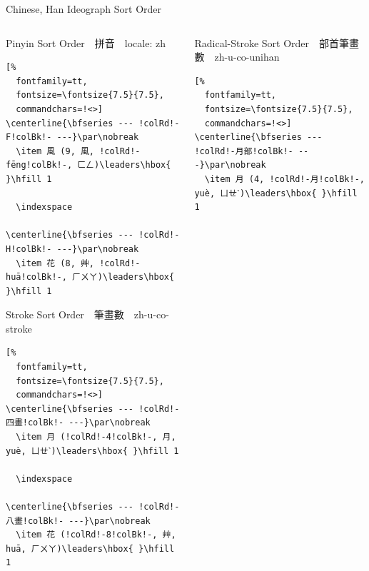 \documentclass[aspectratio=169,10pt]{beamer}
\begin{document}
\begin{frame}[fragile]{Chinese, Han Ideograph Sort Order}
\begin{columns}
\begin{column}{73mm}
\begin{exampleblock}{Pinyin {\footnotesize Sort Order~~拼音~~\scriptsize locale: zh}}
\makeatletter
\def\verbatim@font{\fontsize{7.5}{7.5}\selectfont\textjapanese}
\makeatother
\begin{Verbatim}[%
  fontfamily=tt,
  fontsize=\fontsize{7.5}{7.5},
  commandchars=!<>]
\centerline{\bfseries --- !colRd!-F!colBk!- ---}\par\nobreak
  \item 風 (9, 風, !colRd!-fēng!colBk!-, ㄈㄥ)\leaders\hbox{ }\hfill 1

  \indexspace

\centerline{\bfseries --- !colRd!-H!colBk!- ---}\par\nobreak
  \item 花 (8, 艸, !colRd!-huā!colBk!-, ㄏㄨㄚ)\leaders\hbox{ }\hfill 1
\end{Verbatim}
\end{exampleblock}
\begin{exampleblock}{Stroke {\footnotesize Sort Order~~筆畫數~~\scriptsize zh-u-co-stroke}}
\makeatletter
\def\verbatim@font{\fontsize{7.5}{7.5}\selectfont\textjapanese}
\makeatother
\begin{Verbatim}[%
  fontfamily=tt,
  fontsize=\fontsize{7.5}{7.5},
  commandchars=!<>]
\centerline{\bfseries --- !colRd!-四畫!colBk!- ---}\par\nobreak
  \item 月 (!colRd!-4!colBk!-, 月, yuè, ㄩㄝˋ)\leaders\hbox{ }\hfill 1

  \indexspace

\centerline{\bfseries --- !colRd!-八畫!colBk!- ---}\par\nobreak
  \item 花 (!colRd!-8!colBk!-, 艸, huā, ㄏㄨㄚ)\leaders\hbox{ }\hfill 1
\end{Verbatim}
\end{exampleblock}
\end{column}
\begin{column}{73mm}
\begin{exampleblock}{Radical-Stroke {\footnotesize Sort Order~~部首筆畫數~~\scriptsize zh-u-co-unihan}}
\begin{Verbatim}[%
  fontfamily=tt,
  fontsize=\fontsize{7.5}{7.5},
  commandchars=!<>]
\centerline{\bfseries --- !colRd!-月部!colBk!- ---}\par\nobreak
  \item 月 (4, !colRd!-月!colBk!-, yuè, ㄩㄝˋ)\leaders\hbox{ }\hfill 1


\end{Verbatim}
\end{exampleblock}
\end{column}
\end{columns}
\end{frame}
\end{document}
